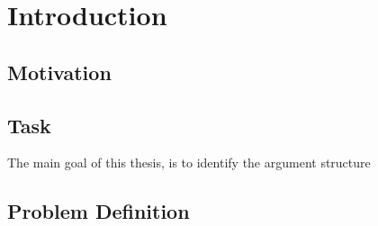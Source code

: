 \section{Introduction}
\subsection{Motivation}
\subsection{Task}
The main goal of this thesis, is to identify the argument structure 
\subsection{Problem Definition}